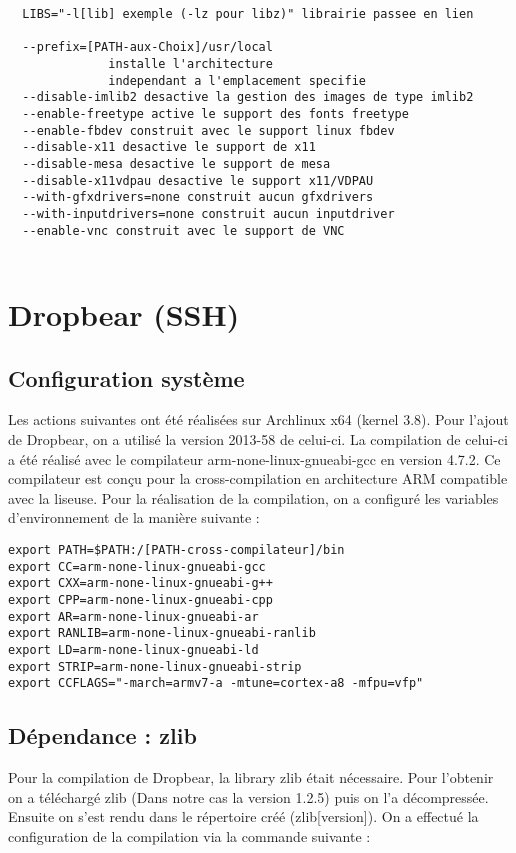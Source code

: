 \begin{lstlisting}
  LIBS="-l[lib] exemple (-lz pour libz)" librairie passee en lien
  
  --prefix=[PATH-aux-Choix]/usr/local
              installe l'architecture
              independant a l'emplacement specifie
  --disable-imlib2 desactive la gestion des images de type imlib2
  --enable-freetype active le support des fonts freetype 
  --enable-fbdev construit avec le support linux fbdev
  --disable-x11 desactive le support de x11
  --disable-mesa desactive le support de mesa
  --disable-x11vdpau desactive le support x11/VDPAU
  --with-gfxdrivers=none construit aucun gfxdrivers
  --with-inputdrivers=none construit aucun inputdriver
  --enable-vnc construit avec le support de VNC
  
\end{lstlisting}

\newpage   	
	
\section{Dropbear (SSH)}	

\subsection{Configuration système}

Les actions suivantes ont été réalisées sur Archlinux x64 (kernel 3.8).
Pour l'ajout de Dropbear, on a utilisé la version 2013-58 de celui-ci. La compilation de celui-ci a été réalisé avec le compilateur arm-none-linux-gnueabi-gcc en version 4.7.2. Ce compilateur est conçu pour la cross-compilation en architecture ARM compatible avec la liseuse. 
Pour la réalisation de la compilation, on a configuré les variables d'environnement de la manière suivante : 

\begin{lstlisting}
export PATH=$PATH:/[PATH-cross-compilateur]/bin
export CC=arm-none-linux-gnueabi-gcc
export CXX=arm-none-linux-gnueabi-g++
export CPP=arm-none-linux-gnueabi-cpp
export AR=arm-none-linux-gnueabi-ar
export RANLIB=arm-none-linux-gnueabi-ranlib
export LD=arm-none-linux-gnueabi-ld
export STRIP=arm-none-linux-gnueabi-strip
export CCFLAGS="-march=armv7-a -mtune=cortex-a8 -mfpu=vfp"
\end{lstlisting}

\subsection{Dépendance : zlib}
Pour la compilation de Dropbear, la library zlib était nécessaire.
Pour l'obtenir on a téléchargé zlib (Dans notre cas la version 1.2.5) puis on  l'a décompressée. Ensuite on s'est rendu dans le répertoire créé (zlib[version]). On a effectué la configuration de la compilation via la commande suivante :

